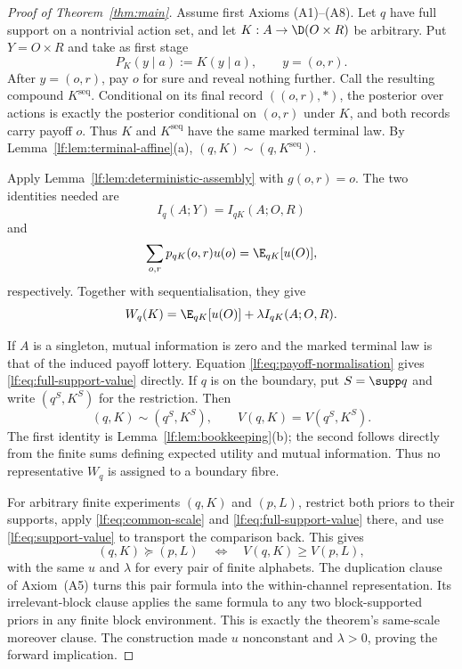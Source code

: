 \begin{proof}[Proof of Theorem~\ref{thm:main}]
Assume first Axioms \textup{(A1)--(A8)}.  Let $q$ have full support on a
nontrivial action set, and let $K:A\to\D(O\times R)$ be arbitrary.  Put
$Y=O\times R$ and take as first stage
\[
P_K(y\mid a):=K(y\mid a),
\qquad y=(o,r).
\]
After $y=(o,r)$, pay $o$ for sure and reveal nothing further.  Call the
resulting compound $K^{\mathrm{seq}}$.  Conditional on its final record
$((o,r),\ast)$, the posterior over actions is exactly the posterior conditional
on $(o,r)$ under $K$, and both records carry payoff $o$.  Thus $K$ and
$K^{\mathrm{seq}}$ have the same marked terminal law.  By
Lemma~\ref{lf:lem:terminal-affine}\textup{(a)},
$(q,K)\sim(q,K^{\mathrm{seq}})$.

Apply Lemma~\ref{lf:lem:deterministic-assembly} with $g(o,r)=o$.  The two
identities needed are
\[
I_q(A;Y)=I_{qK}(A;O,R)
\]
and
\[
\sum_{o,r}p_{qK}(o,r)u(o)=\E_{qK}[u(O)],
\]
respectively.  Together with sequentialisation, they give
\begin{equation}
W_q(K)=\E_{qK}[u(O)]+\lambda I_{qK}(A;O,R).
\label{lf:eq:full-support-value}
\end{equation}

If $A$ is a singleton, mutual information is zero and the marked terminal law
is that of the induced payoff lottery.  Equation
\eqref{lf:eq:payoff-normalisation} gives
\eqref{lf:eq:full-support-value} directly.  If $q$ is on the boundary, put
$S=\supp q$ and write $(q^S,K^S)$ for the restriction.  Then
\begin{equation}
(q,K)\sim(q^S,K^S),
\qquad
V(q,K)=V(q^S,K^S).
\label{lf:eq:support-value}
\end{equation}
The first identity is Lemma~\ref{lf:lem:bookkeeping}\textup{(b)}; the second
follows directly from the finite sums defining expected utility and mutual
information.  Thus no representative $W_q$ is assigned to a boundary fibre.

For arbitrary finite experiments $(q,K)$ and $(p,L)$, restrict both priors to
their supports, apply
\eqref{lf:eq:common-scale} and \eqref{lf:eq:full-support-value} there, and use
\eqref{lf:eq:support-value} to transport the comparison back.  This gives
\begin{equation}
(q,K)\succeq(p,L)
\quad\Longleftrightarrow\quad
V(q,K)\ge V(p,L),
\label{lf:eq:pair-value}
\end{equation}
with the same $u$ and $\lambda$ for every pair of finite alphabets.  The
duplication clause of Axiom~\textup{(A5)} turns this pair formula into the
within-channel representation.  Its irrelevant-block clause applies the same
formula to any two block-supported priors in any finite block environment.
This is exactly the theorem's same-scale moreover clause.  The construction
made $u$ nonconstant and $\lambda>0$, proving the forward implication.


\end{proof}
